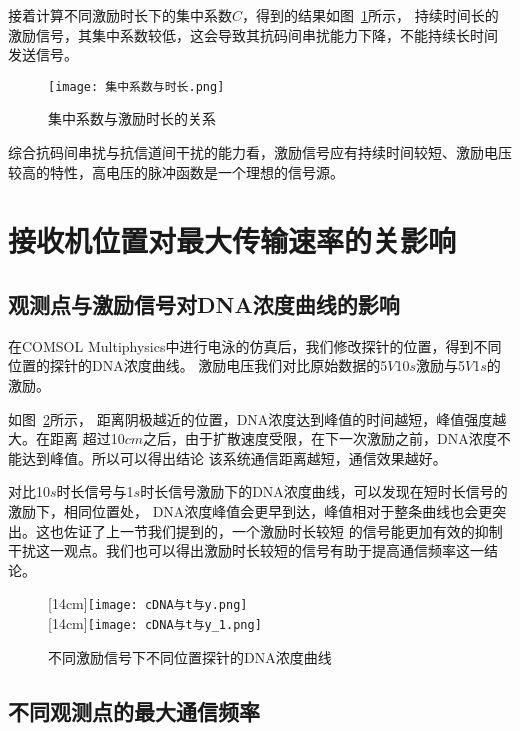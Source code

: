接着计算不同激励时长下的集中系数$C$，得到的结果如图~\ref{集中系数与时长}所示，
持续时间长的激励信号，其集中系数较低，这会导致其抗码间串扰能力下降，不能持续长时间
发送信号。
\begin{figure}[H]
    \centering
    \texttt{[image: 集中系数与时长.png]}
    \caption{集中系数与激励时长的关系}
    \label{集中系数与时长}
\end{figure}

综合抗码间串扰与抗信道间干扰的能力看，激励信号应有持续时间较短、激励电压较高的特性，高电压的脉冲函数是一个理想的信号源。

\section{接收机位置对最大传输速率的关影响}
\subsection{观测点与激励信号对DNA浓度曲线的影响}

在COMSOL Multiphysics中进行电泳的仿真后，我们修改探针的位置，得到不同位置的探针的DNA浓度曲线。
激励电压我们对比原始数据的5$V$10$s$激励与5$V$1$s$的激励。

如图~\ref{不同激励探针DNA曲线}所示，
距离阴极越近的位置，DNA浓度达到峰值的时间越短，峰值强度越大。在距离
超过10$cm$之后，由于扩散速度受限，在下一次激励之前，DNA浓度不能达到峰值。所以可以得出结论
该系统通信距离越短，通信效果越好。


对比10$s$时长信号与1$s$时长信号激励下的DNA浓度曲线，可以发现在短时长信号的激励下，相同位置处，
DNA浓度峰值会更早到达，峰值相对于整条曲线也会更突出。这也佐证了上一节我们提到的，一个激励时长较短
的信号能更加有效的抑制干扰这一观点。我们也可以得出激励时长较短的信号有助于提高通信频率这一结论。
\begin{figure}[H]
    \centering
                    [14cm]{\texttt{[image: cDNA与t与y.png]}}\\
                    [14cm]{\texttt{[image: cDNA与t与y\_1.png]}}\\
    \caption{不同激励信号下不同位置探针的DNA浓度曲线}
    \label{不同激励探针DNA曲线}
\end{figure}

\subsection{不同观测点的最大通信频率}

